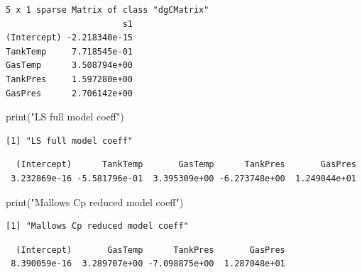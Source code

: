 \documentclass[
  letterpaper,
  DIV=11,
  numbers=noendperiod]{scrartcl}
\newenvironment{Shaded}{\begin{snugshade}}{\end{snugshade}}
\newcommand{\FunctionTok}[1]{\textcolor[rgb]{0.28,0.35,0.67}{#1}}
\newcommand{\NormalTok}[1]{\textcolor[rgb]{0.00,0.23,0.31}{#1}}
\newcommand{\SpecialCharTok}[1]{\textcolor[rgb]{0.37,0.37,0.37}{#1}}
\newcommand{\StringTok}[1]{\textcolor[rgb]{0.13,0.47,0.30}{#1}}
\begin{document}
\begin{verbatim}
5 x 1 sparse Matrix of class "dgCMatrix"
                       s1
(Intercept) -2.218340e-15
TankTemp     7.718545e-01
GasTemp      3.508794e+00
TankPres     1.597280e+00
GasPres      2.706142e+00
\end{verbatim}

\begin{Shaded}
\begin{Highlighting}[]
\FunctionTok{print}\NormalTok{(}\StringTok{"LS full model coeff"}\NormalTok{)}
\end{Highlighting}
\end{Shaded}

\begin{verbatim}
[1] "LS full model coeff"
\end{verbatim}

\begin{Shaded}
\end{Shaded}

\begin{verbatim}
  (Intercept)      TankTemp       GasTemp      TankPres       GasPres 
 3.232869e-16 -5.581796e-01  3.395309e+00 -6.273748e+00  1.249044e+01 
\end{verbatim}

\begin{Shaded}
\begin{Highlighting}[]
\FunctionTok{print}\NormalTok{(}\StringTok{"Mallows Cp reduced model coeff"}\NormalTok{)}
\end{Highlighting}
\end{Shaded}

\begin{verbatim}
[1] "Mallows Cp reduced model coeff"
\end{verbatim}

\begin{Shaded}
\end{Shaded}

\begin{verbatim}
  (Intercept)       GasTemp      TankPres       GasPres 
 8.390059e-16  3.289707e+00 -7.098875e+00  1.287048e+01 
\end{verbatim}
\end{document}
